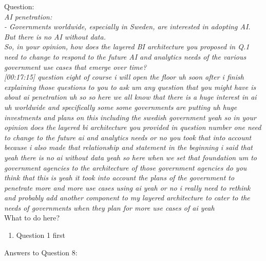 Question:\\
\emph{
    AI penetration:\\
- Governments worldwide, especially in Sweden, are interested in adopting AI.
But there is no AI without data.\\ So, in your opinion, how does the layered BI
architecture you proposed in Q.1 need to change to respond to the future AI and
analytics needs of the various government use cases that emerge over time?
}\\

\emph{[00:17:15] question eight of course i will open the floor uh soon after i
finish explaining those questions to you to ask um any question that you might have is about ai penetration
uh so so here we all know that there is a huge interest in ai uh worldwide and specifically some
some governments are putting uh huge investments and plans on this including the swedish government
yeah so in your opinion does the layered bi architecture you provided in question number
one need to change to the future ai and analytics needs or no you took that into account because i also
made that relationship and statement in the beginning i said that yeah there is no ai without data
yeah so here when we set that foundation um to government agencies to the architecture of those government
agencies do you think that this is yeah it took into account the plans of the government to penetrate
more and more use cases using ai yeah or no i really need to rethink and probably add another component
to my layered architecture to cater to the needs of governments when they plan for more use cases
of ai yeah}\\

What to do here?
\begin{enumerate}
    \item Question 1 first
  \end{enumerate}

\newpage Answers to Question 8:

